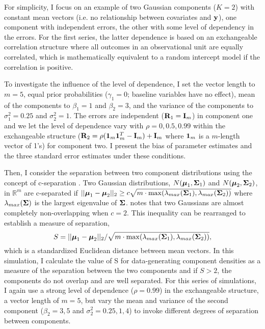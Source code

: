  For simplicity, I focus on an example of two Gaussian components ($K = 2$) with constant mean vectors (i.e. no relationship between covariates and $\mathbf y$), one component with independent errors, the other with some level of dependency in the errors. For the first series, the latter dependence is based on an exchangeable correlation structure where all outcomes in an observational unit are equally correlated, which is mathematically equivalent to a random intercept model if the correlation is positive.
 
To investigate the influence of the level of dependence, I set the vector length to $m=5$, equal prior probabilities ($\gamma_{1}=0$; baseline variables have no effect), mean of the components to $\beta_{1}=1$ and $\beta_{2}=3$, and the variance of the components to $\sigma^{2}_{1}=0.25$ and $\sigma^{2}_{2}=1$. The errors are independent ($\mathbf R_{1}=\mathbf I_{m}$) in component one and we let the level of dependence vary with $\rho=0,0.5,0.99$ within the exchangeable structure ($\mathbf R_2 = \rho(\mathbf 1_m\mathbf 1_{m}^{T}-\mathbf I_m)+\mathbf I_m$ where $\mathbf 1_m$ is a $m$-length vector of 1's) for component two. I present the bias of parameter estimates and the three standard error estimates under these conditions.

Then, I consider the separation between two component distributions using the concept of c-separation \cite{dasgupta1999}. Two Gaussian distributions, $N(\boldsymbol\mu_{1},\boldsymbol\Sigma_{1})$ and $N(\boldsymbol\mu_{2},\boldsymbol\Sigma_{2})$, in $\mathbb{R}^{m}$ are c-separated if $||\boldsymbol\mu_{1}-\boldsymbol\mu_{2}||_{2}\geq c\sqrt{m\cdot\max(\lambda_{max}(\boldsymbol\Sigma_{1}),\lambda_{max}(\boldsymbol\Sigma_{2}))}$
where $\lambda_{max}(\boldsymbol\Sigma)$ is the largest eigenvalue of $\boldsymbol\Sigma$. \textcite{dasgupta1999} notes that two Gaussians are almost completely non-overlapping when $c=2$. This inequality can be rearranged to establish a measure of separation,
$$S = ||\boldsymbol\mu_{1}-\boldsymbol\mu_{2}||_{2}/\sqrt{m\cdot\max(\lambda_{max}(\boldsymbol\Sigma_{1}),\lambda_{max}(\boldsymbol\Sigma_{2}))},$$
which is a standardized Euclidean distance between mean vectors. In this simulation, I calculate the value of S for data-generating component densities as a measure of the separation between the two components and if $S>2$, the components do not overlap and are well separated. For this series of simulations, I again use a strong level of dependence ($\rho=0.99$) in the exchangeable structure, a vector length of $m=5$, but vary the mean and variance of the second component ($\beta_{2}=3,5$ and $\sigma_{2}^{2}=0.25,1,4$) to invoke different degrees of separation between components.

